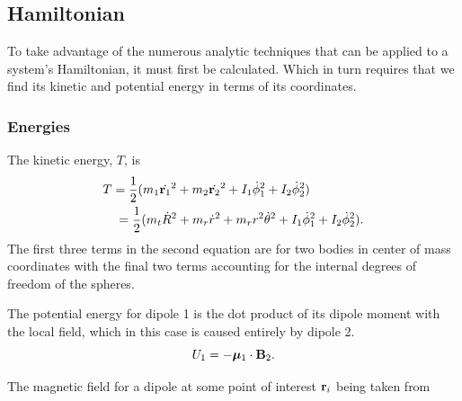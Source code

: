 \documentclass[prbg,preprint]{revtex4-1}
\newcommand{\cvec}[1]{{\rm{\bf{#1}}}}
\begin{document}
\subsection{Hamiltonian}
To take advantage of the numerous analytic techniques that can be applied to a system's Hamiltonian, it must first be calculated. Which in turn requires that we find its kinetic and potential energy in terms of its coordinates.
\subsubsection{Energies}
The kinetic energy, $T$, is \cite{taylor2005classical}
\begin{equation}
	\begin{multlined}
            T = 
            \frac{1}{2}(
            	m_1 \dot {\cvec{r}_1}^2
            	+m_2 \dot {\cvec{r}_2}^2
            	+ I_1 \dot \phi_1^2
            	+ I_2 \dot \phi_2^2
            )
            \\
            =\frac{1}{2}(
            	m_t \dot R^2
            	+m_r \dot r^2
            	+m_r r^2 \dot \theta^2
            	+ I_1 \dot \phi_1^2
            	+ I_2 \dot \phi_2^2
).
  \end{multlined}
\end{equation}
The first three terms in the second equation are for two bodies in center of mass coordinates with the final two terms accounting for the internal degrees of freedom of the spheres. 

The potential energy for dipole 1 is the dot product of its dipole moment with the local field, which in this case is caused entirely by dipole 2.
\begin{equation}
U_1 = -\boldsymbol \mu_1 \cdot \cvec B_2.
\end{equation}

The magnetic field for a dipole at some point of interest $\cvec r_i$ being taken from \cite{griffiths2013introduction}
\end{document}

